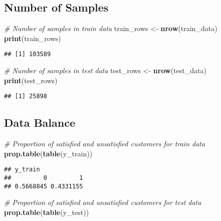 \documentclass[
]{article}
\newenvironment{Shaded}{\begin{snugshade}}{\end{snugshade}}
\newcommand{\CommentTok}[1]{\textcolor[rgb]{0.56,0.35,0.01}{\textit{#1}}}
\newcommand{\FunctionTok}[1]{\textcolor[rgb]{0.13,0.29,0.53}{\textbf{#1}}}
\newcommand{\NormalTok}[1]{#1}
\newcommand{\OtherTok}[1]{\textcolor[rgb]{0.56,0.35,0.01}{#1}}
\begin{document}
\hypertarget{number-of-samples}{%
\subsection{Number of Samples}\label{number-of-samples}}

\begin{Shaded}
\begin{Highlighting}[]
\CommentTok{\# Number of samples in train data}
\NormalTok{train\_rows }\OtherTok{\textless{}{-}} \FunctionTok{nrow}\NormalTok{(train\_data)}
\FunctionTok{print}\NormalTok{(train\_rows)}
\end{Highlighting}
\end{Shaded}

\begin{verbatim}
## [1] 103589
\end{verbatim}

\begin{Shaded}
\begin{Highlighting}[]
\CommentTok{\# Number of samples in test data}
\NormalTok{test\_rows }\OtherTok{\textless{}{-}} \FunctionTok{nrow}\NormalTok{(test\_data)}
\FunctionTok{print}\NormalTok{(test\_rows)}
\end{Highlighting}
\end{Shaded}

\begin{verbatim}
## [1] 25898
\end{verbatim}

\hypertarget{data-balance}{%
\subsection{Data Balance}\label{data-balance}}

\begin{Shaded}
\begin{Highlighting}[]
\CommentTok{\# Proportion of satisfied and unsatisfied customers for train data}
\FunctionTok{prop.table}\NormalTok{(}\FunctionTok{table}\NormalTok{(y\_train))}
\end{Highlighting}
\end{Shaded}

\begin{verbatim}
## y_train
##         0         1 
## 0.5668845 0.4331155
\end{verbatim}

\begin{Shaded}
\begin{Highlighting}[]
\CommentTok{\# Proportion of satisfied and unsatisfied customers for test data}
\FunctionTok{prop.table}\NormalTok{(}\FunctionTok{table}\NormalTok{(y\_test))}
\end{Highlighting}
\end{Shaded}
\end{document}
